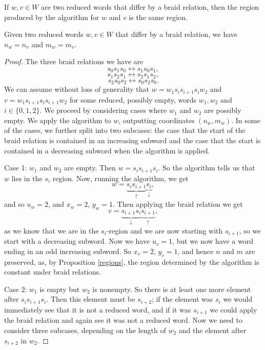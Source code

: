 \documentclass[10pt,a4paper]{amsart}
\begin{document}
\begin{proposition}\label{regions}
    If $w,v\in W$ are two reduced words that differ by a braid relation, then the region produced by the algorithm for $w$ and $v$ is the same region. 
\end{proposition}

\begin{proposition} \label{regionslemma}
    Given two reduced words $w,v\in W$ that differ by a braid relation, we have $n_w=n_v$ and $m_w=m_v$. 
\end{proposition}

\begin{proof}
    The three braid relations we have are 
    \[s_0s_1s_0\longleftrightarrow s_1s_0s_1,\]
    \[s_1s_2s_1\longleftrightarrow s_2s_1s_2,\]
    \[s_2s_0s_2\longleftrightarrow s_0s_2s_0.\]
    We can assume without loss of generality that $w=w_1s_is_{i+1}s_iw_2$ and $v=w_1s_{i+1}s_is_{i+1}w_2$ for some reduced, possibly empty, words $w_1, w_2$ and $i\in \{0,1,2\}$. We proceed by considering cases where $w_1$ and $w_2$ are possibly empty. We apply the algorithm to $w$, outputting coordinates $(n_w,m_w)$. In some of the cases, we further split into two subcases:  the case that the start of the braid relation is contained in an increasing subword and the case that the start is contained in a decreasing subword when the algorithm is applied.
    
    Case 1: $w_1$ and $w_2$ are empty. Then $w=s_is_{i+1}s_i$. So the algorithm tells us that $w$ lies in the $s_i$ region. Now, running the algorithm, we get 
        \[w=\underbrace{s_is_{i+1}}_\uparrow \underbrace{s_i}_\downarrow,\]
        and so $u_w=2$, and $x_w=2$, $y_w=1$. Then applying the braid relation we get 
        \[v=\underbrace{s_{i+1}s_i}_\downarrow \underbrace{s_{i+1}}_\uparrow,\]
        as we know that we are in the $s_i$-region  and we are now starting with $s_{i+1}$, so we start with a decreasing subword. Now we have $u_v=1$, but we now have a word ending in an odd increasing subword. So $x_v=2$, $y_v=1$, and hence $n$ and $m$ are preserved, as, by Proposition \ref{regions}, the region determined by the algorithm is constant under braid relations.

    Case 2: $w_1$ is empty but $w_2$ is nonempty. 
    So there is at least one more element after $s_is_{i+1}s_i$. Then this element must be $s_{i+2}$; if the element was $s_i$ we would immediately see that it is not a reduced word, and if it was $s_{i+1}$ we could apply the braid relation and again see it was not a reduced word. Now we need to consider three subcases, depending on the length of $w_2$ and the element after $s_{i+2}$ in $w_2$.


\end{proof}
\end{document}

